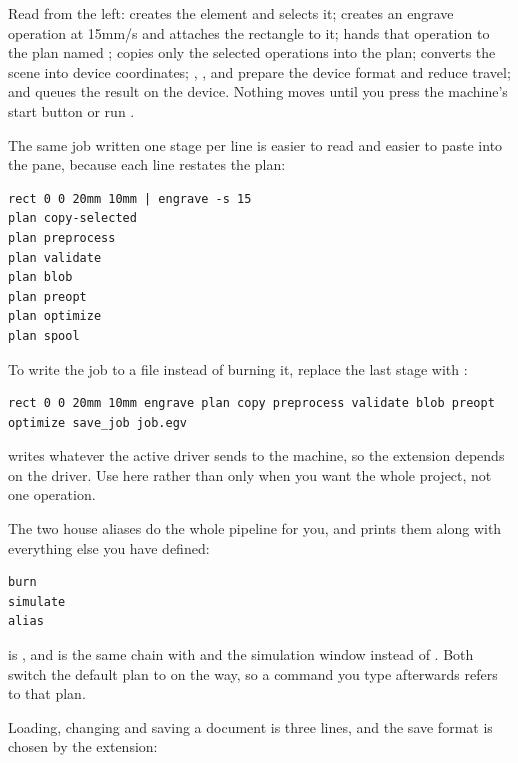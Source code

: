 \noindent Read from the left:  creates the element and selects it;
 creates an engrave operation at \unit{15}\unit{mm/s} and
attaches the rectangle to it;  hands that operation to the plan named
;  copies only the selected operations into the plan;
 converts the scene into device coordinates; ,
,  and  prepare the device format and reduce
travel; and  queues the result on the device. Nothing moves until you
press the machine's start button or run .

The same job written one stage per line is easier to read and easier to paste into
the  pane, because each line restates the plan:

\begin{lstlisting}[style=konsole]
rect 0 0 20mm 10mm | engrave -s 15
plan copy-selected
plan preprocess
plan validate
plan blob
plan preopt
plan optimize
plan spool
\end{lstlisting}

\noindent To write the job to a file instead of burning it, replace the last stage
with :

\begin{lstlisting}[style=konsole]
rect 0 0 20mm 10mm engrave plan copy preprocess validate blob preopt optimize save_job job.egv
\end{lstlisting}

\noindent{} writes whatever the active driver sends to the machine, so
the extension depends on the driver. Use  here rather than
 only when you want the whole project, not one operation.

The two house aliases do the whole pipeline for you, and  prints them
along with everything else you have defined:

\begin{lstlisting}[style=konsole]
burn
simulate
alias
\end{lstlisting}

\noindent {} is , and  is the same chain with  and the
simulation window instead of . Both switch the default plan to 
on the way, so a  command you type afterwards refers to that plan.

Loading, changing and saving a document is three lines, and the save format is
chosen by the extension:


